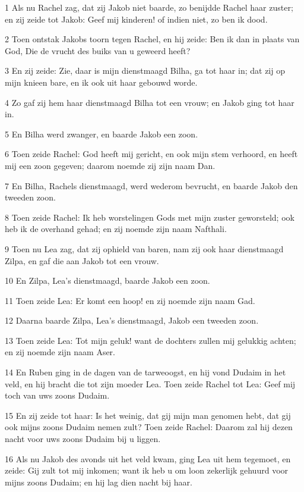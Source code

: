 \par 1 Als nu Rachel zag, dat zij Jakob niet baarde, zo benijdde Rachel haar zuster; en zij zeide tot Jakob: Geef mij kinderen! of indien niet, zo ben ik dood.
\par 2 Toen ontstak Jakobs toorn tegen Rachel, en hij zeide: Ben ik dan in plaats van God, Die de vrucht des buiks van u geweerd heeft?
\par 3 En zij zeide: Zie, daar is mijn dienstmaagd Bilha, ga tot haar in; dat zij op mijn knieen bare, en ik ook uit haar gebouwd worde.
\par 4 Zo gaf zij hem haar dienstmaagd Bilha tot een vrouw; en Jakob ging tot haar in.
\par 5 En Bilha werd zwanger, en baarde Jakob een zoon.
\par 6 Toen zeide Rachel: God heeft mij gericht, en ook mijn stem verhoord, en heeft mij een zoon gegeven; daarom noemde zij zijn naam Dan.
\par 7 En Bilha, Rachels dienstmaagd, werd wederom bevrucht, en baarde Jakob den tweeden zoon.
\par 8 Toen zeide Rachel: Ik heb worstelingen Gods met mijn zuster geworsteld; ook heb ik de overhand gehad; en zij noemde zijn naam Nafthali.
\par 9 Toen nu Lea zag, dat zij ophield van baren, nam zij ook haar dienstmaagd Zilpa, en gaf die aan Jakob tot een vrouw.
\par 10 En Zilpa, Lea's dienstmaagd, baarde Jakob een zoon.
\par 11 Toen zeide Lea: Er komt een hoop! en zij noemde zijn naam Gad.
\par 12 Daarna baarde Zilpa, Lea's dienstmaagd, Jakob een tweeden zoon.
\par 13 Toen zeide Lea: Tot mijn geluk! want de dochters zullen mij gelukkig achten; en zij noemde zijn naam Aser.
\par 14 En Ruben ging in de dagen van de tarweoogst, en hij vond Dudaim in het veld, en hij bracht die tot zijn moeder Lea. Toen zeide Rachel tot Lea: Geef mij toch van uws zoons Dudaim.
\par 15 En zij zeide tot haar: Is het weinig, dat gij mijn man genomen hebt, dat gij ook mijns zoons Dudaim nemen zult? Toen zeide Rachel: Daarom zal hij dezen nacht voor uws zoons Dudaim bij u liggen.
\par 16 Als nu Jakob des avonds uit het veld kwam, ging Lea uit hem tegemoet, en zeide: Gij zult tot mij inkomen; want ik heb u om loon zekerlijk gehuurd voor mijns zoons Dudaim; en hij lag dien nacht bij haar.
